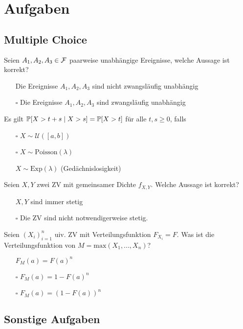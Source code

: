 \section{Aufgaben}


\subsection{Multiple Choice}

Seien $A_1, A_2, A_3 \in \mathcal{F}$ paarweise unabhängige Ereignisse, welche Aussage ist korrekt?
\begin{itemize}
	\item[\marked] Die Ereignisse $A_1, A_2, A_3$ sind nicht zwangsläufig unabhängig
	\item[$\square$] Die Ereignisse $A_1, A_2, A_3$ sind zwangsläufig unabhängig
\end{itemize}

\hrulefill

Es gilt $\mathbb{P}[X > t + s \; | \; X > s] = \mathbb{P}[X > t]$ für alle $t,s \geq 0$, falls
\begin{itemize}
	\item[$\square$] $X \sim \mathcal{U}([a,b])$
	\item[$\square$] $X \sim \text{Poisson}(\lambda)$
	\item[\marked] $X \sim \text{Exp}(\lambda)$ (Gedächnislosigkeit)
\end{itemize}

\hrulefill

Seien $X,Y$ zwei ZV mit gemeinsamer Dichte $f_{X,Y}$. Welche Aussage ist korrekt?
\begin{itemize}
	\item[\marked] $X,Y$ sind immer stetig
	\item[$\square$] Die ZV sind nicht notwendigerweise stetig.
\end{itemize}

\hrulefill

Seien $(X_i)_{i = 1}^n$ uiv. ZV mit Verteilungsfunktion $F_{X_i} = F$. Was ist die Verteilungsfunktion von $M = \text{max}(X_1,...,X_n)$?
\begin{itemize}
	\item[\marked] $F_M(a) = F(a)^n$
	\item[$\square$] $F_M(a) = 1 - F(a)^n$
	\item[$\square$] $F_M(a) = (1 - F(a))^n$
\end{itemize}

\subsection{Sonstige Aufgaben}

